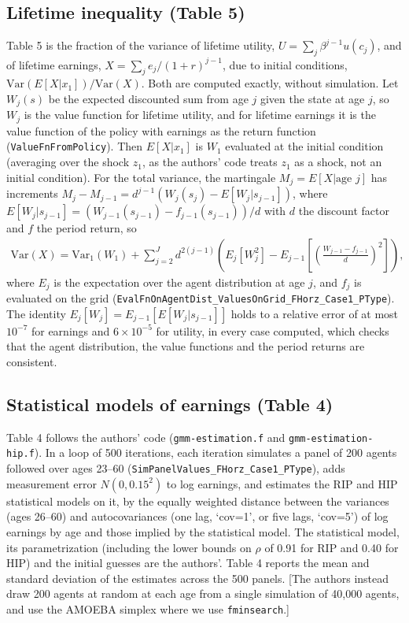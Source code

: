 \documentclass[11pt,fleqn]{article}
\begin{document}
\subsection{Lifetime inequality (Table 5)}

Table 5 is the fraction of the variance of lifetime utility, $U=\sum_j\beta^{j-1}u(c_j)$, and of lifetime earnings, $X=\sum_j e_j/(1+r)^{j-1}$, due to initial conditions, $\text{Var}(E[X|x_1])/\text{Var}(X)$. Both are computed exactly, without simulation. Let $W_j(s)$ be the expected discounted sum from age $j$ given the state at age $j$, so $W_j$ is the value function for lifetime utility, and for lifetime earnings it is the value function of the policy with earnings as the return function (\verb|ValueFnFromPolicy|). Then $E[X|x_1]$ is $W_1$ evaluated at the initial condition (averaging over the shock $z_1$, as the authors' code treats $z_1$ as a shock, not an initial condition). For the total variance, the martingale $M_j=E[X|\text{age }j]$ has increments $M_j-M_{j-1}=d^{j-1}\left(W_j(s_j)-E[W_j|s_{j-1}]\right)$, where $E[W_j|s_{j-1}]=(W_{j-1}(s_{j-1})-f_{j-1}(s_{j-1}))/d$ with $d$ the discount factor and $f$ the period return, so
\begin{align*}
 \text{Var}(X) = \text{Var}_1(W_1) + \sum_{j=2}^{J} d^{2(j-1)}\left( E_j[W_j^2] - E_{j-1}\left[\left(\frac{W_{j-1}-f_{j-1}}{d}\right)^2\right]\right),
\end{align*}
where $E_j$ is the expectation over the agent distribution at age $j$, and $f_j$ is evaluated on the grid (\verb|EvalFnOnAgentDist_ValuesOnGrid_FHorz_Case1_PType|). The identity $E_j[W_j]=E_{j-1}[E[W_j|s_{j-1}]]$ holds to a relative error of at most $10^{-7}$ for earnings and $6\times10^{-5}$ for utility, in every case computed, which checks that the agent distribution, the value functions and the period returns are consistent.


\subsection{Statistical models of earnings (Table 4)}

Table 4 follows the authors' code (\verb|gmm-estimation.f| and \verb|gmm-estimation-hip.f|). In a loop of 500 iterations, each iteration simulates a panel of 200 agents followed over ages 23--60 (\verb|SimPanelValues_FHorz_Case1_PType|), adds measurement error $N(0,0.15^2)$ to log earnings, and estimates the RIP and HIP statistical models on it, by the equally weighted distance between the variances (ages 26--60) and autocovariances (one lag, `cov=1', or five lags, `cov=5') of log earnings by age and those implied by the statistical model. The statistical model, its parametrization (including the lower bounds on $\rho$ of 0.91 for RIP and 0.40 for HIP) and the initial guesses are the authors'. Table 4 reports the mean and standard deviation of the estimates across the 500 panels. [The authors instead draw 200 agents at random at each age from a single simulation of 40,000 agents, and use the AMOEBA simplex where we use \verb|fminsearch|.]
\end{document}
